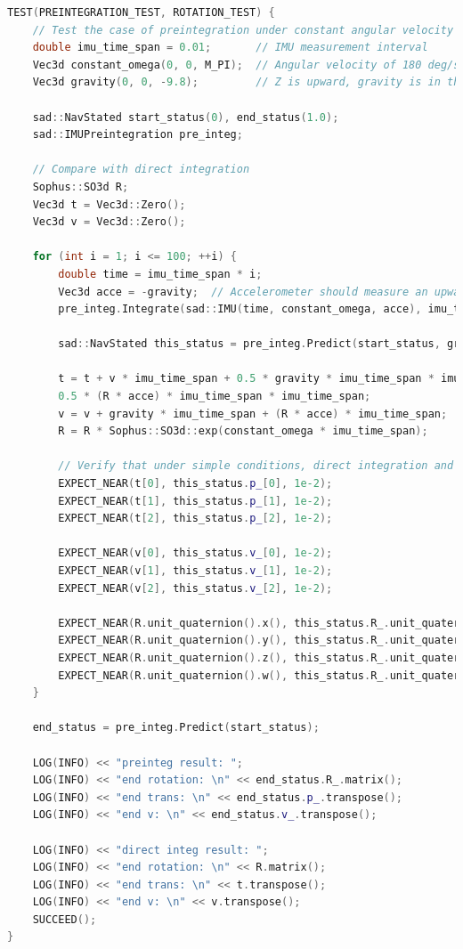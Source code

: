 \begin{lstlisting}[language=c++,caption=src/ch4/test\_preintegraion.cc]
TEST(PREINTEGRATION_TEST, ROTATION_TEST) {
	// Test the case of preintegration under constant angular velocity
	double imu_time_span = 0.01;       // IMU measurement interval
	Vec3d constant_omega(0, 0, M_PI);  // Angular velocity of 180 deg/s, rotating for 1 second equals 180 degrees
	Vec3d gravity(0, 0, -9.8);         // Z is upward, gravity is in the negative direction
	
	sad::NavStated start_status(0), end_status(1.0);
	sad::IMUPreintegration pre_integ;
	
	// Compare with direct integration
	Sophus::SO3d R;
	Vec3d t = Vec3d::Zero();
	Vec3d v = Vec3d::Zero();
	
	for (int i = 1; i <= 100; ++i) {
		double time = imu_time_span * i;
		Vec3d acce = -gravity;  // Accelerometer should measure an upward force
		pre_integ.Integrate(sad::IMU(time, constant_omega, acce), imu_time_span);
		
		sad::NavStated this_status = pre_integ.Predict(start_status, gravity);
		
		t = t + v * imu_time_span + 0.5 * gravity * imu_time_span * imu_time_span +
		0.5 * (R * acce) * imu_time_span * imu_time_span;
		v = v + gravity * imu_time_span + (R * acce) * imu_time_span;
		R = R * Sophus::SO3d::exp(constant_omega * imu_time_span);
		
		// Verify that under simple conditions, direct integration and preintegration yield the same result
		EXPECT_NEAR(t[0], this_status.p_[0], 1e-2);
		EXPECT_NEAR(t[1], this_status.p_[1], 1e-2);
		EXPECT_NEAR(t[2], this_status.p_[2], 1e-2);
		
		EXPECT_NEAR(v[0], this_status.v_[0], 1e-2);
		EXPECT_NEAR(v[1], this_status.v_[1], 1e-2);
		EXPECT_NEAR(v[2], this_status.v_[2], 1e-2);
		
		EXPECT_NEAR(R.unit_quaternion().x(), this_status.R_.unit_quaternion().x(), 1e-4);
		EXPECT_NEAR(R.unit_quaternion().y(), this_status.R_.unit_quaternion().y(), 1e-4);
		EXPECT_NEAR(R.unit_quaternion().z(), this_status.R_.unit_quaternion().z(), 1e-4);
		EXPECT_NEAR(R.unit_quaternion().w(), this_status.R_.unit_quaternion().w(), 1e-4);
	}
	
	end_status = pre_integ.Predict(start_status);
	
	LOG(INFO) << "preinteg result: ";
	LOG(INFO) << "end rotation: \n" << end_status.R_.matrix();
	LOG(INFO) << "end trans: \n" << end_status.p_.transpose();
	LOG(INFO) << "end v: \n" << end_status.v_.transpose();
	
	LOG(INFO) << "direct integ result: ";
	LOG(INFO) << "end rotation: \n" << R.matrix();
	LOG(INFO) << "end trans: \n" << t.transpose();
	LOG(INFO) << "end v: \n" << v.transpose();
	SUCCEED();
}
\end{lstlisting}

